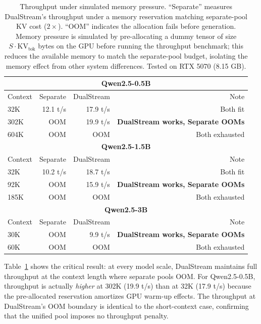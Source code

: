 \documentclass[review]{elsarticle}
\theoremstyle{definition}
\theoremstyle{remark}
\begin{document}
\begin{table}[t]
\centering
\caption{Throughput under simulated memory pressure. ``Separate'' measures
DualStream's throughput under a memory reservation matching separate-pool
KV cost ($2\times$). ``OOM'' indicates the allocation fails before generation.
Memory pressure is simulated by pre-allocating a dummy tensor of size
$S \cdot \text{KV}_{\text{tok}}$ bytes on the GPU before running the
throughput benchmark; this reduces the available memory to match the
separate-pool budget, isolating the memory effect from other system
differences. Tested on RTX 5070 (8.15 GB).}
\label{tab:pressure}
\begin{tabular}{lrrr}
\toprule
\multicolumn{4}{c}{\textbf{Qwen2.5-0.5B}} \\
\midrule
Context & Separate & DualStream & Note \\
\midrule
32K  & 12.1 t/s & 17.9 t/s & Both fit \\
302K & OOM      & 19.9 t/s & \textbf{DualStream works, Separate OOMs} \\
604K & OOM      & OOM      & Both exhausted \\
\midrule
\multicolumn{4}{c}{\textbf{Qwen2.5-1.5B}} \\
\midrule
Context & Separate & DualStream & Note \\
\midrule
32K  & 10.2 t/s & 18.7 t/s & Both fit \\
92K  & OOM      & 15.9 t/s & \textbf{DualStream works, Separate OOMs} \\
185K & OOM      & OOM      & Both exhausted \\
\midrule
\multicolumn{4}{c}{\textbf{Qwen2.5-3B}} \\
\midrule
Context & Separate & DualStream & Note \\
\midrule
30K  & OOM      & 9.9 t/s  & \textbf{DualStream works, Separate OOMs} \\
60K  & OOM      & OOM      & Both exhausted \\
\bottomrule
\end{tabular}
\end{table}

Table~\ref{tab:pressure} shows the critical result: at every model scale,
DualStream maintains full throughput at the context length where separate
pools OOM. For Qwen2.5-0.5B, throughput is actually \emph{higher} at 302K
(19.9 t/s) than at 32K (17.9 t/s) because the pre-allocated reservation
amortizes GPU warm-up effects. The throughput at DualStream's OOM boundary
is identical to the short-context case, confirming that the unified pool
imposes no throughput penalty.
\end{document}
